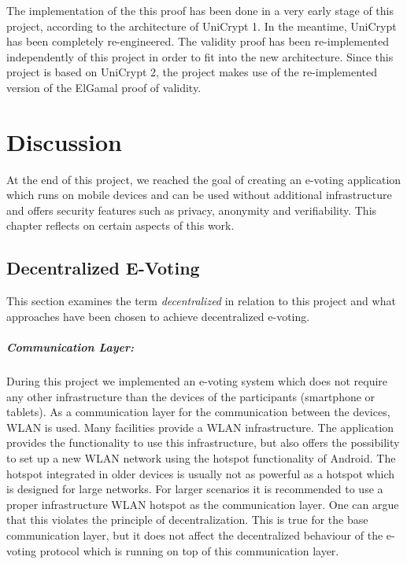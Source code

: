 \documentclass[numbers=noenddot, abstract=on, a4paper, headsepline,
footsepline, oneside, openright, draft=off, listof=leveldown]{scrreprt}
\begin{document}
The implementation of the this proof has been done in a very early stage of this
project, according to the architecture of UniCrypt 1. In the meantime, UniCrypt
has been completely re-engineered. The validity proof has been re-implemented
independently of this project in order to fit into the new architecture. Since
this project is based on UniCrypt 2, the project makes use of the re-implemented
version of the ElGamal proof of validity.


\chapter{Discussion}
\label{cha:discussion}
At the end of this project, we reached the goal of creating an e-voting
application which runs on mobile devices and can be used without additional
infrastructure and offers security features such as privacy, anonymity and
verifiability. This chapter reflects on certain aspects of this work.

\section{Decentralized E-Voting}
\label{sec:discussiondecentralizedevoting}
This section examines the term \emph{decentralized} in relation to this project
and what approaches have been chosen to achieve decentralized e-voting.

\paragraph{Communication Layer:} During this project we implemented an e-voting
system which does not require any other infrastructure than the devices of the
participants (smartphone or tablets). As a communication layer for the
communication between the devices, WLAN is used. Many facilities provide a WLAN
infrastructure. The application provides the functionality to use this
infrastructure, but also offers the possibility to set up a new WLAN network
using the hotspot functionality of Android. The hotspot integrated in older
devices is usually not as powerful as a hotspot which is designed for large
networks. For larger scenarios it is recommended to use a proper infrastructure
WLAN hotspot as the communication layer. One can argue that this violates the
principle of decentralization. This is true for the base communication layer,
but it does not affect the decentralized behaviour of the e-voting protocol
which is running on top of this communication layer.
\end{document}
